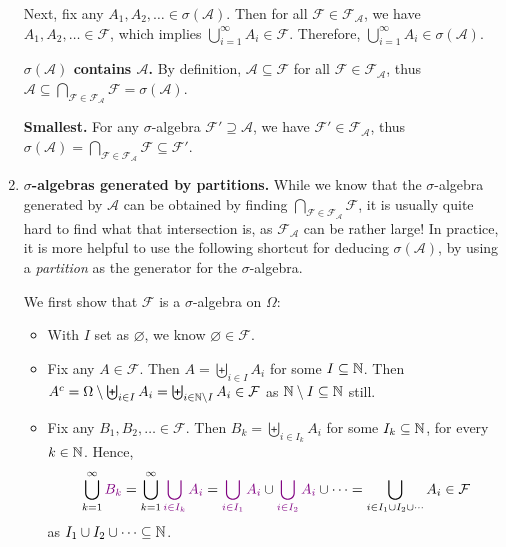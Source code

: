 \begin{enumerate}
\begin{pf}
Next, fix any \(A_1,A_2,\dotsc\in\sigma(\mathcal{A})\). Then for all
\(\mathcal{F}\in\mathcal{F}_{\mathcal{A}}\), we have
\(A_1,A_2,\dotsc\in\mathcal{F}\), which implies \(\bigcup_{i=1}^{\infty}A_i\in\mathcal{F}\).
Therefore, \(\bigcup_{i=1}^{\infty}A_i\in\sigma(\mathcal{A})\).

\textbf{\(\sigma(\mathcal{A})\) contains \(\mathcal{A}\).}
By definition, \(\mathcal{A}\subseteq \mathcal{F}\) for all \(\mathcal{F}\in\mathcal{F}_{\mathcal{A}}\), thus
\(\mathcal{A}\subseteq\bigcap_{\mathcal{F}\in\mathcal{F}_{\mathcal{A}}}\mathcal{F}=\sigma(\mathcal{A})\).

\textbf{Smallest.}
For any \(\sigma\)-algebra \(\mathcal{F}'\supseteq \mathcal{A}\), we have
\(\mathcal{F}'\in\mathcal{F}_{\mathcal{A}}\), thus
\(\sigma(\mathcal{A})=\bigcap_{\mathcal{F}\in\mathcal{F}_{\mathcal{A}}}\mathcal{F}\subseteq
\mathcal{F}'\).
\end{pf}

\item \textbf{\(\sigma\)-algebras generated by partitions.} While we know that
the \(\sigma\)-algebra generated by \(\mathcal{A}\) can be obtained by finding
\(\bigcap_{\mathcal{F}\in\mathcal{F}_{\mathcal{A}}}\mathcal{F}\), it is usually
quite hard to find what that intersection is, as \(\mathcal{F}_{\mathcal{A}}\)
can be rather large! In practice, it is more helpful to use the following
shortcut for deducing \(\sigma(\mathcal{A})\), by using a \emph{partition} as the
generator for the \(\sigma\)-algebra.

\begin{pf}
We first show that \(\mathcal{F}\) is a \(\sigma\)-algebra on \(\Omega\):
\begin{itemize}
\item With \(I\) set as \(\varnothing\), we know \(\varnothing\in\mathcal{F}\).
\item Fix any \(A\in\mathcal{F}\). Then \(A=\biguplus_{i\in I}A_i\) for some \(I\subseteq \mathbb{N}\). Then
\(A^c=\Omega\setminus \biguplus_{i\in I}A_i=\biguplus_{i\in\mathbb{N}\setminus I}A_i\in\mathcal{F}\)
as \(\mathbb{N}\setminus I\subseteq \mathbb{N}\) still.
\item Fix any \(B_1,B_2,\dotsc\in\mathcal{F}\). Then \(B_k=\biguplus_{i\in I_k}
A_i\) for some \(I_k\subseteq \mathbb{N}\), for every \(k\in\mathbb{N}\). Hence,
\[
\bigcup_{k=1}^{\infty}\vc{B_k}
=\bigcup_{k=1}^{\infty}\vc{\bigcup_{i\in I_k}A_i}
=\vc{\bigcup_{i\in I_1}A_i}\cup\vc{\bigcup_{i\in I_2}A_i}\cup\dotsb
=\bigcup_{i\in I_1\cup I_2\cup\dotsb}A_i
\in \mathcal{F}
\]
as \(I_1\cup I_2\cup\dotsb\subseteq \mathbb{N}\).
\end{itemize}


\end{pf}
\end{enumerate}
